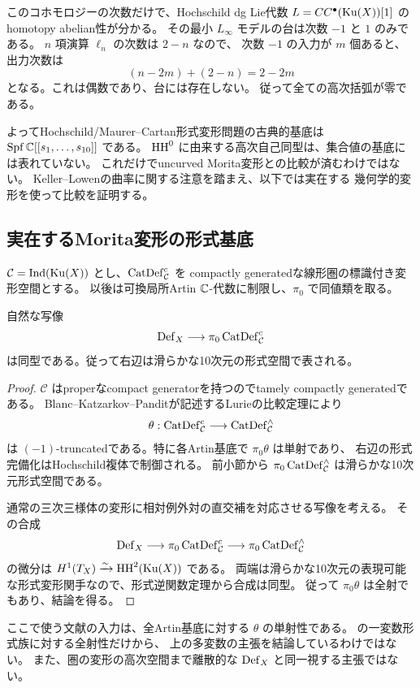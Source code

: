 このコホモロジーの次数だけで、Hochschild dg Lie代数
$L=CC^\bullet(\operatorname{Ku}(X))[1]$ のhomotopy abelian性が分かる。
その最小 $L_\infty$ モデルの台は次数 $-1$ と $1$ のみである。
$n$ 項演算 $\ell_n$ の次数は $2-n$ なので、
次数 $-1$ の入力が $m$ 個あると、出力次数は
\[
 (n-2m)+(2-n)=2-2m
\]
となる。これは偶数であり、台には存在しない。
従って全ての高次括弧が零である。

よってHochschild/Maurer--Cartan形式変形問題の古典的基底は
$\operatorname{Spf}\mathbb C[[s_1,\ldots,s_{10}]]$ である。
$\operatorname{HH}^0$ に由来する高次自己同型は、集合値の基底には表れていない。
これだけでuncurved Morita変形との比較が済むわけではない。
Keller--Lowen\cite{KL}の曲率に関する注意を踏まえ、以下では実在する
幾何学的変形を使って比較を証明する。

\subsection{実在するMorita変形の形式基底}

$\mathcal C=\operatorname{Ind}(\operatorname{Ku}(X))$ とし、$\operatorname{CatDef}^c_{\mathcal C}$ を
compactly generatedな線形圏の標識付き変形空間とする。
以後は可換局所Artin $\mathbb C$-代数に制限し、$\pi_0$ で同値類を取る。

\begin{theorem}\label{thm:formal-torelli}
自然な写像
\[
 \operatorname{Def}_X\longrightarrow\pi_0\operatorname{CatDef}^c_{\mathcal C}
\]
は同型である。従って右辺は滑らかな10次元の形式空間で表される。
\end{theorem}

\begin{proof}
$\mathcal C$ はproperなcompact generatorを持つのでtamely compactly generatedである。
Blanc--Katzarkov--Pandit\cite[Section 3.3]{BKP}が記述するLurieの比較定理により
\[
 \theta:\operatorname{CatDef}^c_{\mathcal C}\longrightarrow\operatorname{CatDef}^\wedge_{\mathcal C}
\]
は $(-1)$-truncatedである。特に各Artin基底で $\pi_0\theta$ は単射であり、
右辺の形式完備化はHochschild複体で制御される。
前小節から $\pi_0\operatorname{CatDef}^\wedge_{\mathcal C}$ は滑らかな10次元形式空間である。

通常の三次三様体の変形に相対例外対の直交補を対応させる写像を考える。
その合成
\[
 \operatorname{Def}_X\longrightarrow\pi_0\operatorname{CatDef}^c_{\mathcal C}
 \longrightarrow\pi_0\operatorname{CatDef}^\wedge_{\mathcal C}
\]
の微分は $H^1(T_X)\xrightarrow{\sim}\operatorname{HH}^2(\operatorname{Ku}(X))$ である。
両端は滑らかな10次元の表現可能な形式変形関手なので、形式逆関数定理から合成は同型。
従って $\pi_0\theta$ は全射でもあり、結論を得る。
\end{proof}

ここで使う文献の入力は、全Artin基底に対する $\theta$ の単射性である。
\cite[Theorem 4.27]{BKP}の一変数形式族に対する全射性だけから、
上の多変数の主張を結論しているわけではない。
また、圏の変形の高次空間まで離散的な $\operatorname{Def}_X$ と同一視する主張ではない。

